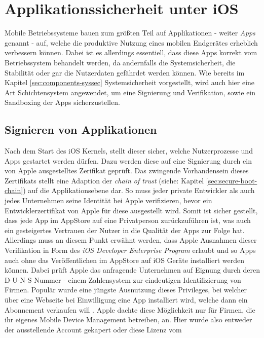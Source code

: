 \section{Applikationssicherheit unter iOS}
	Mobile Betriebssysteme bauen zum größten Teil auf Applikationen - weiter
	\textsl{Apps} genannt - auf, welche die produktive Nutzung eines mobilen
	Endgerätes erheblich verbessern können. Dabei ist es allerdings
	essentiell, dass diese Apps korrekt vom Betriebssystem behandelt werden, da
	andernfalls die Systemsicherheit, die Stabilität oder gar die Nutzerdaten
	gefährdet werden können. Wie bereits im Kapitel \ref{sec:components-syssec}
	Systemsicherheit vorgestellt, wird auch hier eine Art
	Schichtensystem angewendet, um eine Signierung und Verifikation, sowie ein
	Sandboxing der Apps sicherzustellen.
	
	\subsection{Signieren von Applikationen}
		Nach dem Start des iOS Kernels, stellt dieser sicher, welche Nutzerprozesse
		und Apps gestartet werden dürfen. Dazu werden diese auf eine Signierung durch
		ein von Apple ausgestelltes Zerifikat geprüft. Das zwingende Vorhandensein
		dieses Zertifikats stellt eine Adaption der \textsl{chain of trust} (siehe:
		Kapitel \ref{sec:secure-boot-chain}) auf die Applikationsebene dar. So muss
		jeder private Entwickler als auch jedes Unternehmen seine Identität bei Apple
		verifizieren, bevor ein Entwicklerzertifikat von Apple für diese ausgestellt
		wird. Somit ist sicher gestellt, dass jede App im AppStore auf eine
		Privatperson zurückzuführen ist, was auch ein gesteigertes Vertrauen der
		Nutzer in die Qualität der Apps zur Folge hat.\\
		Allerdings muss an diesem Punkt erwähnt werden, dass Apple Ausnahmen dieser
		Verifikation in Form des \textsl{iOS Developer Enterprise
		Program}\cite{AppleDevProg2015}
		erlaubt und so Apps auch ohne das Veröffentlichen im AppStore auf iOS Geräte
		installiert werden können. Dabei prüft Apple das anfragende Unternehmen auf
		Eignung durch deren D-U-N-S Nummer - einem Zahlensystem zur eindeutigen
		Identifizierung von Firmen. Populär wurde eine jüngste Ausnutzung dieses
		Privileges, bei welcher über eine Webseite bei Einwilligung eine App
		installiert wird, welche dann ein Abonnement verkaufen will
		\cite{HeiseCheatApp2015}. Apple dachte diese Möglichkeit nur für
		Firmen, die ihr eigenes Mobile Device Management betreiben, an. Hier wurde
		also entweder der ausstellende Account gekapert oder diese Lizenz vom
